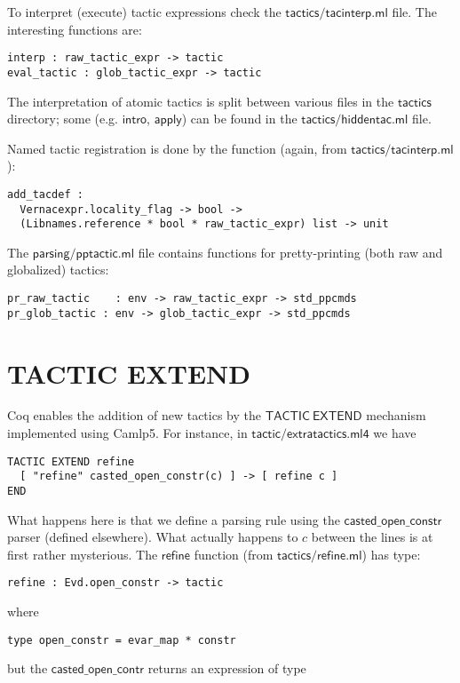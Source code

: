 \documentclass[a4paper,oneside]{book}
\newcommand{\m}[1]{\ensuremath{\mathsf{#1}}}
\begin{document}
To interpret (execute) tactic expressions check the
\m{tactics/tacinterp.ml} file. The interesting functions are:
\begin{lstlisting}
interp : raw_tactic_expr -> tactic
eval_tactic : glob_tactic_expr -> tactic
\end{lstlisting}
The interpretation of atomic tactics is split between various files in
the \m{tactics} directory; some (e.g. \m{intro}, \m{apply}) can be
found in the \m{tactics/hiddentac.ml} file.

Named tactic registration is done by the function (again, from
\m{tactics/tacinterp.ml}):
\begin{lstlisting}
add_tacdef :
  Vernacexpr.locality_flag -> bool ->
  (Libnames.reference * bool * raw_tactic_expr) list -> unit
\end{lstlisting}

The \m{parsing/pptactic.ml} file contains functions for
pretty-printing (both raw and globalized) tactics:

\begin{lstlisting}
pr_raw_tactic    : env -> raw_tactic_expr -> std_ppcmds
pr_glob_tactic : env -> glob_tactic_expr -> std_ppcmds
\end{lstlisting}

\newpage

\section{TACTIC EXTEND}

Coq enables the addition of new tactics by the \m{TACTIC\ EXTEND}
mechanism implemented using Camlp5. For instance, in
\m{tactic/extratactics.ml4} we have
\begin{lstlisting}
TACTIC EXTEND refine
  [ "refine" casted_open_constr(c) ] -> [ refine c ]
END
\end{lstlisting}
What happens here is that we define a parsing rule using the
\m{casted\_open\_constr} parser (defined elsewhere). What actually
happens to $c$ between the lines is at first rather mysterious. The
\m{refine} function (from \m{tactics/refine.ml}) has type:
\begin{lstlisting}
refine : Evd.open_constr -> tactic
\end{lstlisting}
where
\begin{lstlisting}
type open_constr = evar_map * constr
\end{lstlisting}

\noindent
but the \m{casted\_open\_contr} returns an expression of type
\end{document}
